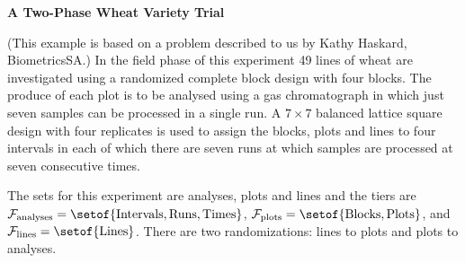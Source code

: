 \begin{flushleft}\Large\bf A Two-Phase Wheat Variety Trial
\end{flushleft}

(This example is based on a problem described to us by
Kathy Haskard, BiometricsSA.)
In the field phase of this experiment 49 lines of wheat are investigated 
using a randomized complete block design with four blocks. 
The produce of each plot is to be analysed using a gas chromatograph 
in which just seven samples can be processed in a single run.  
A $7 \times 7$ balanced lattice square design 
with four replicates is used to assign the blocks, plots and lines to 
four intervals in each of which there are seven runs at which samples are 
processed at seven consecutive times. 

The sets for this experiment are analyses, plots and lines and the tiers are 
${\cal F}_{\rm analyses} = \setof{\mbox{Intervals}, \mbox{Runs}, 
                                  \mbox{Times}}$, 
${\cal F}_{\rm plots} = \setof{\mbox{Blocks}, \mbox{Plots}}$, 
and ${\cal F}_{\rm lines} = \setof{\mbox{Lines}}$.  
There are two randomizations: lines to plots and plots to analyses. 

